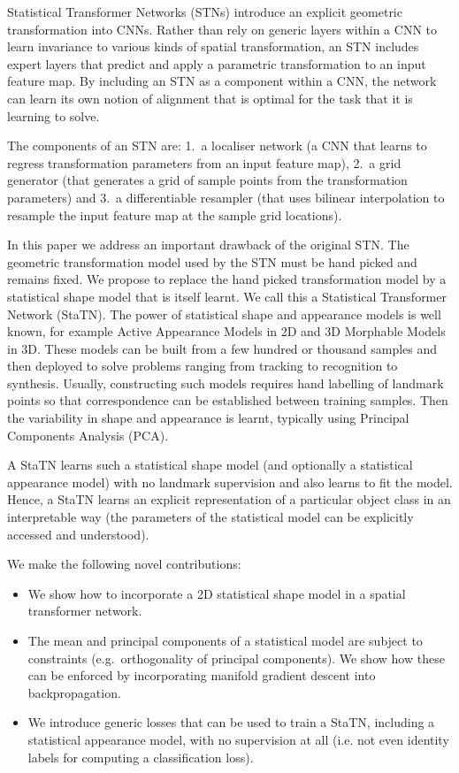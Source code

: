\documentclass[runningheads]{llncs}
\begin{document}
Statistical Transformer Networks (STNs) \cite{jaderberg2015spatial} introduce an explicit geometric transformation into CNNs. Rather than rely on generic layers within a CNN to learn invariance to various kinds of spatial transformation, an STN includes expert layers that predict and apply a parametric transformation to an input feature map. By including an STN as a component within a CNN, the network can learn its own notion of alignment that is optimal for the task that it is learning to solve. 

The components of an STN are: 1.~a localiser network (a CNN that learns to regress transformation parameters from an input feature map), 2.~a grid generator (that generates a grid of sample points from the transformation parameters) and 3.~a differentiable resampler (that uses bilinear interpolation to resample the input feature map at the sample grid locations).

In this paper we address an important drawback of the original STN. The geometric transformation model used by the STN must be hand picked and remains fixed. We propose to replace the hand picked transformation model by a statistical shape model that is itself learnt. We call this a Statistical Transformer Network (StaTN). The power of statistical shape and appearance models is well known, for example Active Appearance Models \cite{cootes2001active} in 2D and 3D Morphable Models \cite{blanz1999morphable} in 3D. These models can be built from a few hundred or thousand samples and then deployed to solve problems ranging from tracking to recognition to synthesis. Usually, constructing such models requires hand labelling of landmark points so that correspondence can be established between training samples. Then the variability in shape and appearance is learnt, typically using Principal Components Analysis (PCA). 

A StaTN learns such a statistical shape model (and optionally a statistical appearance model) with no landmark supervision and also learns to fit the model. Hence, a StaTN learns an explicit representation of a particular object class in an interpretable way (the parameters of the statistical model can be explicitly accessed and understood).

We make the following novel contributions:
\begin{itemize}
    \item We show how to incorporate a 2D statistical shape model in a spatial transformer network.
    \item The mean and principal components of a statistical model are subject to constraints (e.g.~orthogonality of principal components). We show how these can be enforced by incorporating manifold gradient descent into backpropagation.
    \item We introduce generic losses that can be used to train a StaTN, including a statistical appearance model, with no supervision at all (i.e. not even identity labels for computing a classification loss).
\end{itemize}
\end{document}
